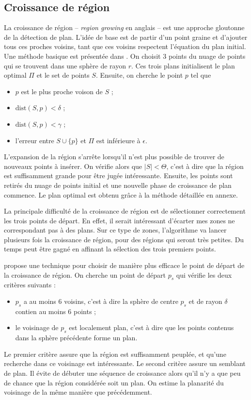 ﻿\documentclass[12pt, twoside]{article}
\begin{document}
\subsection{Croissance de région}
La croissance de région -- \textit{region growing} en anglais – est une approche gloutonne de la détection de plan. L’idée de base est de partir d’un point graine et d’ajouter tous ces proches voisins, tant que ces voisins respectent l’équation du plan initial. Une méthode basique est présentée dans \cite{reggrow1}. On choisit 3 points du nuage de points qui se trouvent dans une sphère de rayon $r$. Ces trois plans initialisent le plan optimal $\Pi$ et le set de points $S$. Ensuite, on cherche le point $p$ tel que
\begin{itemize}
  \item $p$ est le plus proche voison de $S$ ;
  \item $\text{dist}(S,p) < \delta$ ;
  \item $\text{dist}(S,p) < \gamma$ ;
  \item l'erreur entre $S\cup\{p\}$ et $\Pi$ est inférieure à $\epsilon$.
\end{itemize}

L'expansion de la région s'arrête lorsqu'il n'est plus possible de trouver de nouveaux points à insérer. On vérifie alors que $\vert S\vert < \Theta$, c'est à dire que la région est suffisamment grande pour être jugée intéressante. Ensuite, les points sont retirés du nuage de points initial et une nouvelle phase de croissance de plan commence. Le plan optimal est obtenu grâce à la méthode détaillée en annexe.

La principale difficulté de la croissance de région est de sélectionner correctement les trois points de départ. En effet, il serait intéressant d'écarter mes zones ne correspondant pas à des plans. Sur ce type de zones, l'algorithme va lancer plusieurs fois la croissance de région, pour des régions qui seront très petites. Du temps peut être gagné en affinant la sélection des trois premiers points.

\cite{reggrow2} propose une technique pour choisir de manière plus efficace le point de départ de la croissance de région. On cherche un point de départ $p_s$ qui vérifie les deux critères suivants :
\begin{itemize}
  \item $p_s$ a au moins 6 voisins, c'est à dire la sphère de centre $p_s$ et de rayon $\delta$ contien au moins 6 points ;
  \item le voisinage de $p_s$ est localement plan, c'est à dire que les points contenus dans la sphère précédente forme un plan.
\end{itemize}
Le premier critère assure que la région est suffisamment peuplée, et qu’une recherche dans ce voisinage est intéressante. Le second critère assure un semblant de plan. Il évite de débuter une séquence de croissance alors qu’il n’y a que peu de chance que la région considérée soit un plan. On estime la planarité du voisinage de la même manière que précédemment.
\end{document}
